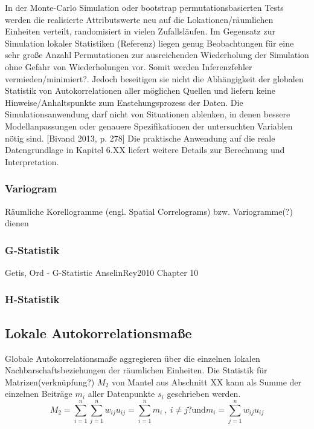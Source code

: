 In der Monte-Carlo Simulation oder bootstrap permutationsbasierten Tests werden die realisierte Attributswerte neu auf die Lokationen/räumlichen Einheiten verteilt, 
randomisiert in vielen Zufallsläufen. 
Im Gegensatz zur Simulation lokaler Statistiken (Referenz) liegen genug Beobachtungen für eine sehr große Anzahl Permutationen 
zur ausreichenden Wiederholung der Simulation ohne Gefahr von Wiederholungen vor. 
Somit werden Inferenzfehler vermieden/minimiert?. 
Jedoch beseitigen sie nicht die Abhängigkeit der globalen Statistik von Autokorrelationen aller möglichen Quellen 
und liefern keine Hinweise/Anhaltspunkte zum Enstehungsprozess der Daten. 
Die Simulationsanwendung darf nicht von Situationen ablenken, in denen bessere Modellanpassungen 
oder genauere Spezifikationen der untersuchten Variablen nötig sind. [Bivand 2013, p. 278]
Die praktische Anwendung auf die reale Datengrundlage in Kapitel 6.XX liefert weitere Details zur Berechnung und Interpretation.

\subsubsection{Variogram}

Räumliche Korellogramme (engl. Spatial Correlograms) bzw. Variogramme(?) dienen

\subsubsection{G-Statistik}
Getis, Ord - G-Statistic
AnselinRey2010 Chapter 10

\subsubsection{H-Statistik}

\subsection{Lokale Autokorrelationsmaße}

Globale Autokorrelationsmaße aggregieren über die einzelnen lokalen Nachbarschaftsbeziehungen der räumlichen Einheiten. 
Die Statistik für Matrizen(verknüpfung?) $M_2$ von Mantel aus Abschnitt XX kann als Summe der einzelnen Beiträge $m_i$ aller Datenpunkte $s_i$ geschrieben werden.
\begin{equation}
    M_2 = \sum_{i=1}^{n}\sum_{j=1}^{n}{w_{ij} u_{ij}} = \sum_{i=1}^{n} m_i ~ , ~ i\neq j? \text{und} m_i = \sum_{j=1}^{n} {w_{ij} u_{ij}}
\end{equation}

